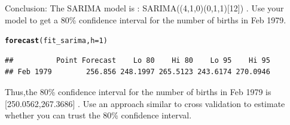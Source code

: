 \documentclass[10pt]{article}\usepackage[]{graphicx}\usepackage[]{color}
\makeatletter
\newcommand{\hlnum}[1]{\textcolor[rgb]{0.686,0.059,0.569}{#1}}%
\newcommand{\hlstd}[1]{\textcolor[rgb]{0.345,0.345,0.345}{#1}}%
\newcommand{\hlkwc}[1]{\textcolor[rgb]{0.333,0.667,0.333}{#1}}%
\newcommand{\hlkwd}[1]{\textcolor[rgb]{0.737,0.353,0.396}{\textbf{#1}}}%
\newenvironment{kframe}{%
 \def\at@end@of@kframe{}%
 \ifinner\ifhmode%
  \def\at@end@of@kframe{\end{minipage}}%
  \begin{minipage}{\columnwidth}%
 \fi\fi%
 \def\FrameCommand##1{\hskip\@totalleftmargin \hskip-\fboxsep
 \colorbox{shadecolor}{##1}\hskip-\fboxsep
     \hskip-\linewidth \hskip-\@totalleftmargin \hskip\columnwidth}%
 \MakeFramed {\advance\hsize-\width
   \@totalleftmargin\z@ \linewidth\hsize
   \@setminipage}}%
 {\par\unskip\endMakeFramed%
 \at@end@of@kframe}
\newenvironment{knitrout}{}{} %
\makeatother
\begin{document}
Conclusion: The SARIMA model is : SARIMA((4,1,0)(0,1,1)[12])
. Use your model to get a 80\% confidence interval for the number of births in Feb 1979.
\begin{knitrout}
\color{fgcolor}\begin{kframe}
\begin{alltt}
\hlkwd{forecast}\hlstd{(fit_sarima,} \hlkwc{h}\hlstd{=}\hlnum{1}\hlstd{)}
\end{alltt}
\begin{verbatim}
##          Point Forecast    Lo 80    Hi 80    Lo 95    Hi 95
## Feb 1979        256.856 248.1997 265.5123 243.6174 270.0946
\end{verbatim}
\end{kframe}
\end{knitrout}
Thus,the 80\% confidence interval for the number of births in Feb 1979 is [250.0562,267.3686]
. Use an approach similar to cross validation to estimate whether you can trust the 80\% confidence interval.
\end{document}
